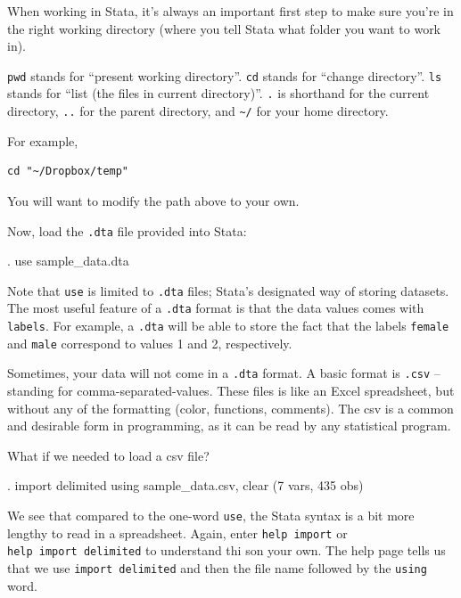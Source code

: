 \documentclass[]{article}
\begin{document}
When working in Stata, it's always an important first step to make sure
you're in the right working directory (where you tell Stata what folder
you want to work in).

\texttt{pwd} stands for ``present working directory''. \texttt{cd}
stands for ``change directory''. \texttt{ls} stands for ``list (the
files in current directory)''. \texttt{.} is shorthand for the current
directory, \texttt{..} for the parent directory, and
\texttt{\textasciitilde{}/} for your home directory.

For example,

\begin{verbatim}
cd "~/Dropbox/temp"
\end{verbatim}

You will want to modify the path above to your own.

Now, load the \texttt{.dta} file provided into Stata:

\begin{stlog}
. use sample_data.dta
{\smallskip}
\end{stlog}

Note that \texttt{use} is limited to \texttt{.dta} files; Stata's
designated way of storing datasets. The most useful feature of a
\texttt{.dta} format is that the data values comes with \texttt{labels}.
For example, a \texttt{.dta} will be able to store the fact that the
labels \texttt{female} and \texttt{male} correspond to values 1 and 2,
respectively.

Sometimes, your data will not come in a \texttt{.dta} format. A basic
format is \texttt{.csv} -- standing for comma-separated-values. These
files is like an Excel spreadsheet, but without any of the formatting
(color, functions, comments). The csv is a common and desirable form in
programming, as it can be read by any statistical program.

What if we needed to load a csv file?

\begin{stlog}
. import delimited using sample_data.csv, clear
(7 vars, 435 obs)
{\smallskip}
\end{stlog}

We see that compared to the one-word \texttt{use}, the Stata syntax is a
bit more lengthy to read in a spreadsheet. Again, enter
\texttt{help\ import} or \texttt{help\ import\ delimited} to understand
thi son your own. The help page tells us that we use
\texttt{import\ delimited} and then the file name followed by the
\texttt{using} word.
\end{document}

